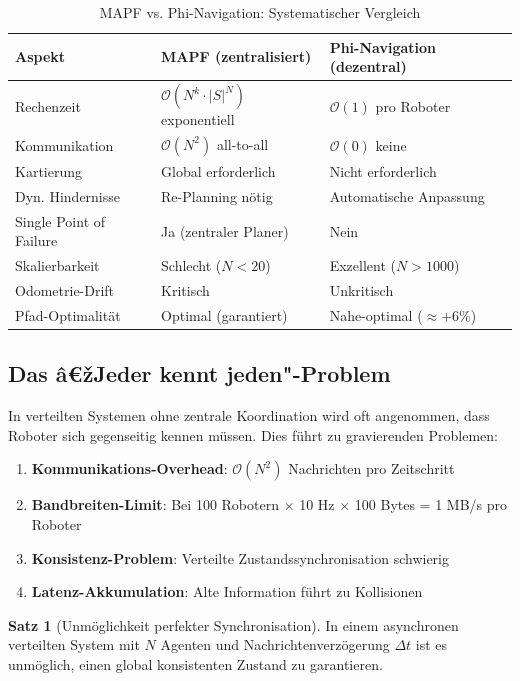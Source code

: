 ﻿\documentclass[a4paper,12pt]{article}
\theoremstyle{definition}
\newtheorem{satz}{Satz}
\begin{document}
\begin{table}[H]
	\centering
	\caption{MAPF vs. Phi-Navigation: Systematischer Vergleich}
	\label{tab:mapf_vs_phi}
	\begin{tabular}{p{4cm}p{5cm}p{5cm}}
		\toprule
		\textbf{Aspekt} & \textbf{MAPF (zentralisiert)} & \textbf{Phi-Navigation (dezentral)} \\
		\midrule
		Rechenzeit & $\mathcal{O}(N^k \cdot |S|^N)$ exponentiell & $\mathcal{O}(1)$ pro Roboter \\
		Kommunikation & $\mathcal{O}(N^2)$ all-to-all & $\mathcal{O}(0)$ keine \\
		Kartierung & Global erforderlich & Nicht erforderlich \\
		Dyn. Hindernisse & Re-Planning nötig & Automatische Anpassung \\
		Single Point of Failure & Ja (zentraler Planer) & Nein \\
		Skalierbarkeit & Schlecht ($N < 20$) & Exzellent ($N > 1000$) \\
		Odometrie-Drift & Kritisch & Unkritisch \\
		Pfad-Optimalität & Optimal (garantiert) & Nahe-optimal ($\approx +6\%$) \\
		\bottomrule
	\end{tabular}
\end{table}

\subsection{Das â€žJeder kennt jeden"-Problem}

In verteilten Systemen ohne zentrale Koordination wird oft angenommen, dass Roboter sich gegenseitig kennen müssen. Dies führt zu gravierenden Problemen:

\begin{enumerate}
	\item \textbf{Kommunikations-Overhead}: $\mathcal{O}(N^2)$ Nachrichten pro Zeitschritt
	\item \textbf{Bandbreiten-Limit}: Bei 100 Robotern $\times$ 10 Hz $\times$ 100 Bytes = 1 MB/s pro Roboter
	\item \textbf{Konsistenz-Problem}: Verteilte Zustandssynchronisation schwierig
	\item \textbf{Latenz-Akkumulation}: Alte Information führt zu Kollisionen
\end{enumerate}

\begin{satz}[Unmöglichkeit perfekter Synchronisation]
	In einem asynchronen verteilten System mit $N$ Agenten und Nachrichtenverzögerung $\Delta t$ ist es unmöglich, einen global konsistenten Zustand zu garantieren.
\end{satz}
\end{document}

